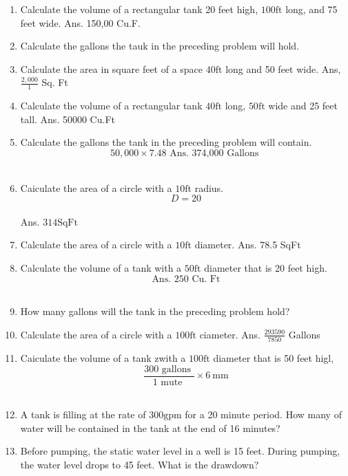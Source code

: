 \begin{enumerate}
\item Calculate the volume of a rectangular tank 20 feet high, $100 \mathrm{ft}$ long, and 75 feet wide. Ans. 150,00 Cu.F.\\
\item Calculate the gallons the tauk in the preceding problem will hold.\\
\item Calculate the area in square feet of a space $40 \mathrm{ft}$ long and 50 feet wide. Ans, $\frac{2,000}{1}$ Sq. Ft\\
\item Calculate the volume of a rectangular tank $40 \mathrm{ft}$ long, $50 \mathrm{ft}$ wide and 25 feet tall. Ans. 50000 Cu.Ft\\
\item Calculate the gallons the tank in the preceding problem will contain.\\
$$
50,000 \times 7.48 \text { Ans. 374,000 Gallons }
$$\\
\item Caiculate the area of a circle with a $10 \mathrm{ft}$ radius.\\
$$
D=20 
$$\\
Ans. $314 \mathrm{SqFt}$\\
\item Calculate the area of a circle with a $10 \mathrm{ft}$ diameter. Ans. 78.5 SqFt\\
\item Calculate the volume of a tank with a $50 \mathrm{ft}$ diameter that is 20 feet high.\\
$$
\text { Ans. } 250 \text { Cu. Ft }
$$\\
\item How many gallons will the tank in the preceding problem hold?\\
\item Calculate the area of a circle with a $100 \mathrm{ft}$ ciameter. Ans. $\frac{293590}{7850}$ Gallons\\
\item Caiculate the volume of a tank zwith a $100 \mathrm{ft}$ diameter that is 50 feet higl,\\
$$
\frac{300 \text { gallons }}{1 \text { mute }} \times 6 \mathrm{~mm}
$$\\
\item A tank is filling at the rate of $300 \mathrm{gpm}$ for a 20 minute period. How many of water will be contained in the tank at the end of 16 minutes?\\
\item Before pumping, the static water level in a well is 15 feet. During pumping, the water level drops to 45 feet. What is the drawdown?\\

\end{enumerate}
